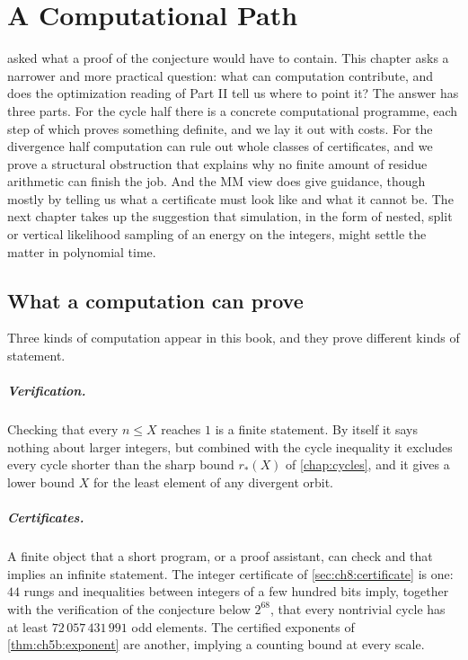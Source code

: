 \chapter{A Computational Path}\label{chap:computation}

 asked what a proof of the conjecture would have to contain.
This chapter asks a narrower and more practical question: what can computation
contribute, and does the optimization reading of Part II tell us where to
point it? The answer has three parts. For the cycle half there is a concrete
computational programme, each step of which proves something definite, and we
lay it out with costs. For the divergence half computation can rule out whole
classes of certificates, and we prove a structural obstruction that explains
why no finite amount of residue arithmetic can finish the job. And the MM view
does give guidance, though mostly by telling us what a certificate must look
like and what it cannot be. The next chapter takes up the suggestion that simulation,
in the form of nested, split or vertical likelihood sampling of an energy on
the integers, might settle the matter in polynomial time.

\section{What a computation can prove}\label{sec:ch10b:what}

Three kinds of computation appear in this book, and they prove different kinds
of statement.

\paragraph{Verification.} Checking that every $n\le X$ reaches $1$ is a finite
statement. By itself it says nothing about larger integers, but combined with
the cycle inequality it excludes every cycle shorter than the sharp bound
$r_*(X)$ of \cref{chap:cycles}, and it gives a lower bound $X$ for the least
element of any divergent orbit.

\paragraph{Certificates.} A finite object that a short program, or a proof
assistant, can check and that implies an infinite statement. The integer
certificate of \cref{sec:ch8:certificate} is one: $44$ rungs and inequalities between integers of a few hundred bits imply, together with the verification of the conjecture below $2^{68}$, that every nontrivial cycle has at least
$72\,057\,431\,991$ odd elements. The certified exponents of
\cref{thm:ch5b:exponent} are another, implying a counting bound at every scale.

